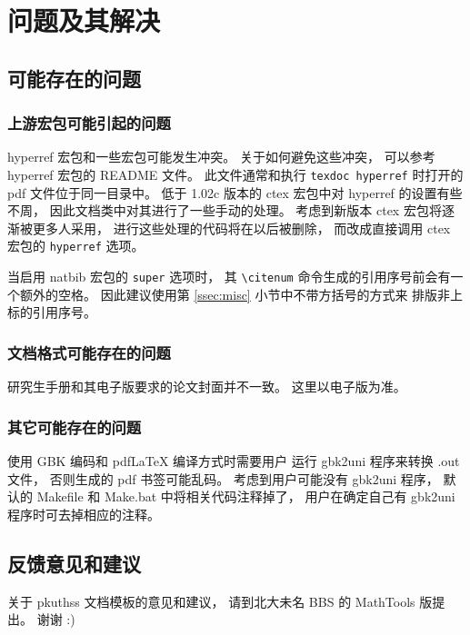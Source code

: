 
\chapter{问题及其解决}
	\section{可能存在的问题}
		\subsection{上游宏包可能引起的问题}

		hyperref 宏包和一些宏包可能发生冲突。
		关于如何避免这些冲突，
		可以参考 hyperref 宏包的 README 文件。
		此文件通常和执行 \verb|texdoc hyperref| %
		时打开的 pdf 文件位于同一目录中。
		低于 1.02c 版本的 ctex 宏包中对 hyperref 的设置有些不周，
		因此文档类中对其进行了一些手动的处理。
		考虑到新版本 ctex 宏包将逐渐被更多人采用，
		进行这些处理的代码将在以后被删除，
		而改成直接调用 ctex 宏包的 \verb|hyperref| 选项。

		当启用 natbib 宏包的 \verb|super| 选项时，
		其 \verb|\citenum| 命令生成的引用序号前会有一个额外的空格。
		因此建议使用第 \ref{ssec:misc} 小节中不带方括号的方式来%
		排版非上标的引用序号。

		\subsection{文档格式可能存在的问题}

		研究生手册和其电子版\cite{pku-thesisstyle}要求的论文封面并不一致。
		这里以电子版为准。

		\subsection{其它可能存在的问题}

		使用 GBK 编码和 pdf\LaTeX{} 编译方式时需要用户%
		运行 gbk2uni 程序来转换 .out 文件，
		否则生成的 pdf 书签可能乱码。
		考虑到用户可能没有 gbk2uni 程序，
		默认的 Makefile 和 Make.bat 中将相关代码注释掉了，
		用户在确定自己有 gbk2uni 程序时可去掉相应的注释。

	\section{反馈意见和建议}

	关于 pkuthss 文档模板的意见和建议，
	请到北大未名 BBS 的 MathTools 版提出。
	谢谢 :)

